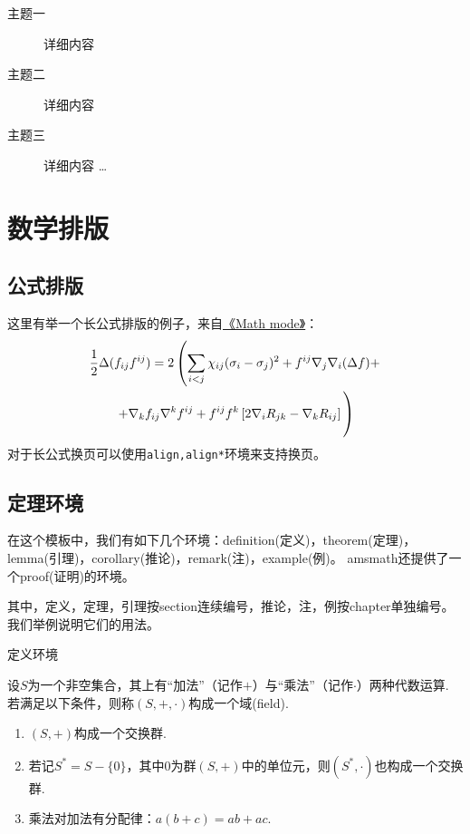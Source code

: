 \begin{description}
	\item[主题一] 详细内容
	\item[主题二] 详细内容
	\item[主题三] 详细内容 \ldots
\end{description}

\section{数学排版}

\subsection{公式排版}

这里有举一个长公式排版的例子，来自\href{http://www.tex.ac.uk/tex-archive/info/math/voss/mathmode/Mathmode.pdf}{《Math mode》}：
\begin{multline}
\frac {1}{2}\Delta (f_{ij}f^{ij})=
2\left (\sum _{i<j}\chi _{ij}(\sigma _{i}-
\sigma _{j}) ^{2}+ f^{ij}\nabla _{j}\nabla _{i}(\Delta f)+\right .\\
\left .+\nabla _{k}f_{ij}\nabla ^{k}f^{ij}+
f^{ij}f^{k}\left [2\nabla _{i}R_{jk}-
\nabla _{k}R_{ij}\right ]\vphantom {\sum _{i<j}}\right )
\end{multline}
对于长公式换页可以使用\verb|align,align*|环境来支持换页。
\subsection{定理环境}

在这个模板中，我们有如下几个环境：definition(定义)，theorem(定理)，lemma(引理)，corollary(推论)，remark(注)，example(例)。
amsmath还提供了一个proof(证明)的环境。

其中，定义，定理，引理按section连续编号，推论，注，例按chapter单独编号。
我们举例说明它们的用法。

定义环境
\begin{definition}[域]\label{def:field}
	设$S$为一个非空集合，其上有“加法”（记作$+$）与“乘法”（记作$\cdot$）两种代数运算. 若满足以下条件，则称$(S,+,\cdot)$构成一个域(field).
	\begin{enumerate}[label={\rm{\roman*)}}]
		\item $(S,+)$构成一个交换群.
		\item 若记$S^{*}=S-\{0\}$，其中$0$为群$(S,+)$中的单位元，则$(S^{*},\cdot)$也构成一个交换群.
		\item 乘法对加法有分配律：$a ( b + c ) = a b + a c$.
	\end{enumerate}
\end{definition}

